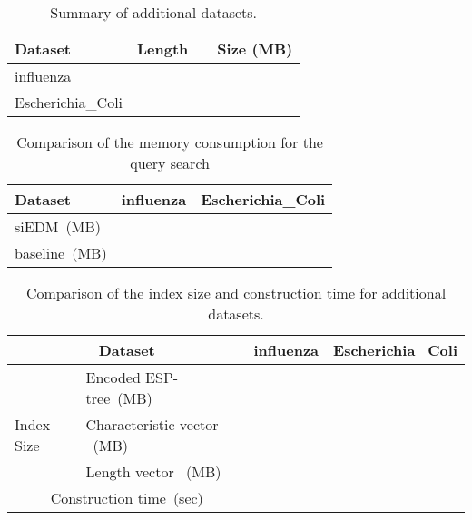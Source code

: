 \documentclass[12pt,a4paper]{scrartcl}
\begin{document}
\begin{table}[t]
\begin{center}
  \caption{Summary of additional datasets.}
  \begin{tabular}{|l|c|c|c|}
    \hline
     Dataset        & Length &  & Size (MB) \\ 
\hline
     influenza &  &  &  \\
      Escherichia\_Coli   &  &    &  \\
\hline
  \end{tabular}
\label{tab:dataset2}
\end{center}
\end{table}

\begin{table}[t]
\begin{center}
  \caption{
Comparison of the memory consumption for the query search
}
\begin{tabular}{|l|r|r|}
    \hline
     Dataset                   & {\bf influenza} & {\bf Escherichia\_Coli} \\ \hline
     siEDM~(MB) &  &  \\
     baseline~(MB) &  &  \\  
     \hline
  \end{tabular}
\label{tab:memory2}
\end{center}
\end{table}

\begin{table}[t]
\begin{center}
  \caption{
Comparison of the index size and construction time for additional datasets.
}
\begin{tabular}{|l|l|r|r|}
    \hline
     \multicolumn{2}{|c|}{Dataset} & {\bf influenza} & {\bf Escherichia\_Coli} \\ \hline

                & Encoded ESP-tree~(MB)   &  &  \\
     Index Size & Characteristic vector ~(MB)&  &  \\
                & Length vector ~(MB)  &  &  \\
\hline
     \multicolumn{2}{|c|}{Construction time~(sec)} &  &   \\
\hline
  \end{tabular}
\label{tab:construct2}
\end{center}
\end{table}

\begin{comment}
\begin{table}
\begin{center}
  \caption{Additional datasets of repetitive text.}
  \begin{tabular}{|l|c|c|c|}
    \hline
     Dataset        & Size (MB)  & Index size (MB) & Compression ratio (\%)\\ 
\hline
influenza     &  &   &  \\
     Escherichia\_Coli  &   &  &  \\
\hline
  \end{tabular}
\label{tab:dataset2}
\end{center}
\end{table}
\end{comment}
\end{document}
